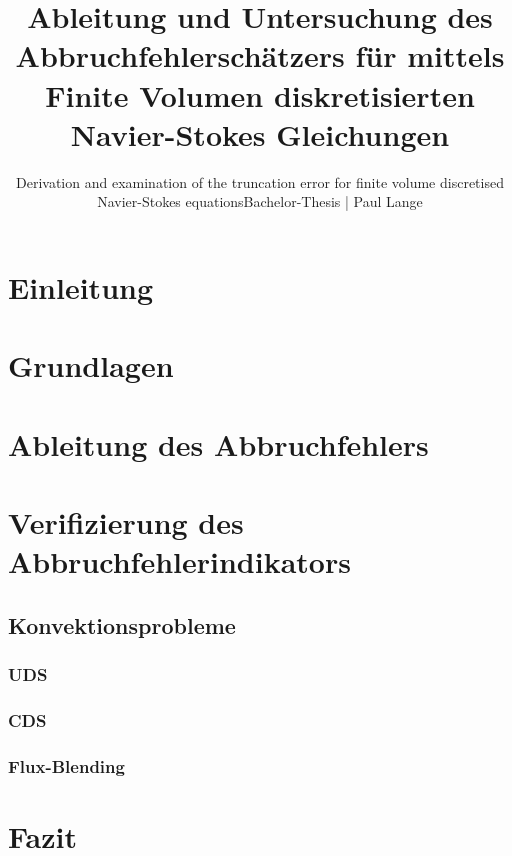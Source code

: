 \documentclass[colorback,longdoc,blackrule,bigchapter,accentcolor=tud2d,11pt]{tudreport}
\title{Ableitung und Untersuchung des Abbruchfehlerschätzers für mittels
Finite Volumen diskretisierten Navier-Stokes Gleichungen\linebreak[1]}
\subtitle{Derivation and examination of the truncation error for finite volume discretised Navier-Stokes equations\linebreak Bachelor-Thesis | Paul Lange}
\begin{document}
\maketitle

\cleardoublepage
\setcounter{page}{1}
\tableofcontents
\listoffigures

\cleardoublepage
{}
\setcounter{page}{1}

\chapter{Einleitung}

\cleardoublepage

\chapter{Grundlagen}






\cleardoublepage

\chapter{Ableitung des Abbruchfehlers}
\label{chap:herleitung}




\cleardoublepage

\chapter{Verifizierung des Abbruchfehlerindikators}
%


\section{Konvektionsprobleme}
\subsection{UDS}
\subsection{CDS}
\subsection{Flux-Blending}
\cleardoublepage


\cleardoublepage

\chapter{Fazit}
\cleardoublepage



\nocite{*}

%
\end{document}
